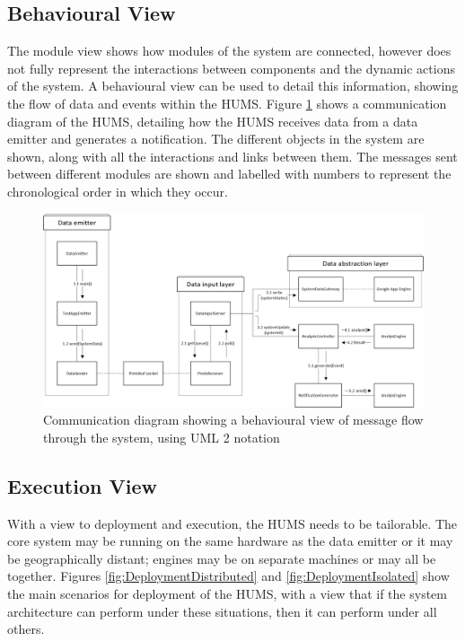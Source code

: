 \documentclass[10pt,a4paper]{article}
\begin{document}
\subsection{Behavioural View}

The module view shows how modules of the system are connected, however 
does not fully represent the interactions between components and the dynamic actions of the system. A behavioural view can be used to detail this information, showing the flow of data and events within the HUMS. Figure \ref{fig:CommunicationDiagram} shows a communication diagram of the 
HUMS, detailing how the HUMS receives data from a data emitter and generates a notification. The different objects in the system are shown, along with all the interactions and links between them. The messages sent between different modules are shown and labelled with numbers to represent the chronological order in which they occur.

\begin{figure}[!ht]
  \centering
  \includegraphics[width=14cm]{images/CommunicationDiagram.png}
  \caption{Communication diagram showing a behavioural view of message 
flow
through the system, using UML 2 notation}
  \label{fig:CommunicationDiagram}
\end{figure}


\subsection{Execution View}
With a view to deployment and execution, the HUMS needs to be tailorable. The core system may be running on the same hardware as the data emitter or it may be geographically distant; engines may be on separate machines or may all be together. Figures \ref{fig:DeploymentDistributed} and \ref{fig:DeploymentIsolated} show the main scenarios for deployment of the HUMS, with a view that if the system architecture can perform under these situations, then it can perform under all others.
\end{document}
